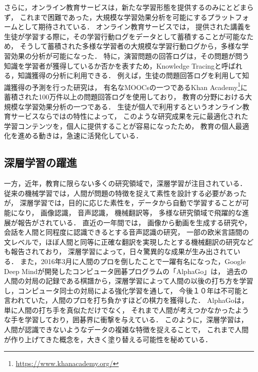 さらに，オンライン教育サービスは，新たな学習形態を提供するのみにとどまらず，
これまで困難であった，大規模な学習効果分析を可能にするプラットフォームとして期待されている．
オンライン教育サービスでは，
提供された講義を生徒が学習する際に，その学習行動ログをデータとして蓄積することが可能なため，
そうして蓄積された多様な学習者の大規模な学習行動ログから，多様な学習効果の分析が可能になった．
特に，演習問題の回答ログは，その問題が問う知識を学習者が獲得しているか否かを表すため，Knowledge Tracingと呼ばれる，知識獲得の分析に利用できる\cite{corbett1994knowledge}．
例えば，生徒の問題回答ログを利用して知識獲得の予測を行った研究\cite{machardy2015toward}は，
有名なMOOCsの一つであるKhan Academy\footnote{\url{https://www.khanacademy.org/}}に蓄積された100万件以上の問題回答ログを使用しており，
教育の分野における大規模な学習効果分析の一つである．
生徒が個人で利用するというオンライン教育サービスならではの特性によって，
このような研究成果を元に最適化された学習コンテンツを，個人に提供することが容易になったため，
教育の個人最適化を進める動きは，急速に活発化している．


\subsection{深層学習の躍進}
一方，近年，教育に限らない多くの研究領域で，深層学習が注目されている．
従来の機械学習では，人間が問題の特徴を捉えて素性を設計する必要があったが，
深層学習では，目的に応じた素性を，データから自動で学習することが可能になり，
画像認識\cite{schroff2015facenet,szegedy2014going}，
音声認識\cite{hinton2012deep, bahdanau2015end}，
機械翻訳\cite{sutskever2014sequence, dong2015multi}等，
多様な研究領域で飛躍的な進展が報告がされている．
直近の一年間では，
画像から動画を生成する研究\cite{vondrick2016generating}や，
会話を人間と同程度に認識できるとする音声認識の研究\cite{xiong2016achieving}，
一部の欧米言語間の文レベルで，ほぼ人間と同等に正確な翻訳を実現したとする機械翻訳の研究\cite{wu2016google}なども報告されており，
深層学習によって，日々驚異的な成果が生み出されている．
また，2016年3月に人間のプロを倒したことで一躍有名になった，Google Deep Mindが開発したコンピュータ囲碁プログラムの「AlphaGo」\cite{silver2016mastering}は，
過去の人間の対局の記録である棋譜から，深層学習によって人間の以後の打ち方を学習し，コンピュータ同士の対局による強化学習を通して，
今後１０年は不可能と言われていた，人間のプロを打ち負かすほどの棋力を獲得した．
AlphaGoは，単に人間の打ち手を真似ただけでなく，
それまで人間が考えつかなかったような手を学習しており，囲碁界に衝撃を与えている．
このように，深層学習は，人間が認識できないようなデータの複雑な特徴を捉えることで，
これまで人間が作り上げてきた概念を，大きく塗り替える可能性を秘めている．


